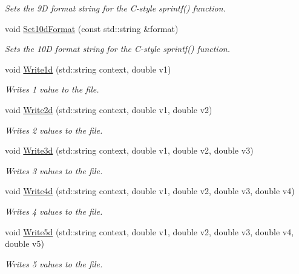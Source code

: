 \begin{DoxyCompactItemize}
\begin{DoxyCompactList}\small\item\em Sets the 9D format string for the C-\/style sprintf() function. \end{DoxyCompactList}\item 
void \hyperlink{classns3_1_1FileAggregator_a9b923ca6f7f01473fe53ad6c75e3ab4c}{Set10d\+Format} (const std\+::string \&format)
\begin{DoxyCompactList}\small\item\em Sets the 10D format string for the C-\/style sprintf() function. \end{DoxyCompactList}\item 
void \hyperlink{classns3_1_1FileAggregator_a3d61505b9ac60dab660e34c433cd2838}{Write1d} (std\+::string context, double v1)
\begin{DoxyCompactList}\small\item\em Writes 1 value to the file. \end{DoxyCompactList}\item 
void \hyperlink{classns3_1_1FileAggregator_a8362a3f2a401ad7220cb7b17bb3e3808}{Write2d} (std\+::string context, double v1, double v2)
\begin{DoxyCompactList}\small\item\em Writes 2 values to the file. \end{DoxyCompactList}\item 
void \hyperlink{classns3_1_1FileAggregator_a1c63f22d8fdf619ee4ce85d2ff754430}{Write3d} (std\+::string context, double v1, double v2, double v3)
\begin{DoxyCompactList}\small\item\em Writes 3 values to the file. \end{DoxyCompactList}\item 
void \hyperlink{classns3_1_1FileAggregator_a6426d07b6168b2ca7fd3a2726c1af517}{Write4d} (std\+::string context, double v1, double v2, double v3, double v4)
\begin{DoxyCompactList}\small\item\em Writes 4 values to the file. \end{DoxyCompactList}\item 
void \hyperlink{classns3_1_1FileAggregator_a94f4cb433a6ec6053582ec0f4ad46449}{Write5d} (std\+::string context, double v1, double v2, double v3, double v4, double v5)
\begin{DoxyCompactList}\small\item\em Writes 5 values to the file. \end{DoxyCompactList}\item 

\end{DoxyCompactItemize}
